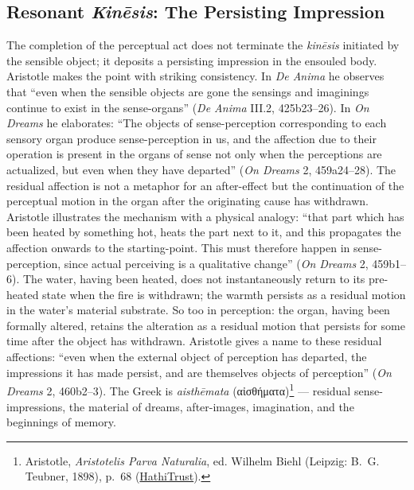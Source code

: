 \documentclass{article}
\newcommand{\gk}[1]{{\greekfont #1}}
\begin{document}
\subsection{Resonant \textit{Kinēsis}: The Persisting Impression}

The completion of the perceptual act does not terminate the \textit{kinēsis} initiated by the sensible object; it deposits a persisting impression in the ensouled body. Aristotle makes the point with striking consistency. In \textit{De Anima} he observes that ``even when the sensible objects are gone the sensings and imaginings continue to exist in the sense-organs'' (\textit{De Anima} III.2, 425b23--26). In \textit{On Dreams} he elaborates: ``The objects of sense-perception corresponding to each sensory organ produce sense-perception in us, and the affection due to their operation is present in the organs of sense not only when the perceptions are actualized, but even when they have departed'' (\textit{On Dreams} 2, 459a24--28). The residual affection is not a metaphor for an after-effect but the continuation of the perceptual motion in the organ after the originating cause has withdrawn. Aristotle illustrates the mechanism with a physical analogy: ``that part which has been heated by something hot, heats the part next to it, and this propagates the affection onwards to the starting-point. This must therefore happen in sense-perception, since actual perceiving is a qualitative change'' (\textit{On Dreams} 2, 459b1--6). The water, having been heated, does not instantaneously return to its pre-heated state when the fire is withdrawn; the warmth persists as a residual motion in the water's material substrate. So too in perception: the organ, having been formally altered, retains the alteration as a residual motion that persists for some time after the object has withdrawn. Aristotle gives a name to these residual affections: ``even when the external object of perception has departed, the impressions it has made persist, and are themselves objects of perception'' (\textit{On Dreams} 2, 460b2--3). The Greek is \textit{aisthēmata} (\gk{αἰσθήματα})\footnote{Aristotle, \textit{Aristotelis Parva Naturalia}, ed. Wilhelm Biehl (Leipzig: B.~G. Teubner, 1898), p.~68 (\href{https://catalog.hathitrust.org/Record/001227560/Home}{HathiTrust}).} --- residual sense-impressions, the material of dreams, after-images, imagination, and the beginnings of memory.
\end{document}

